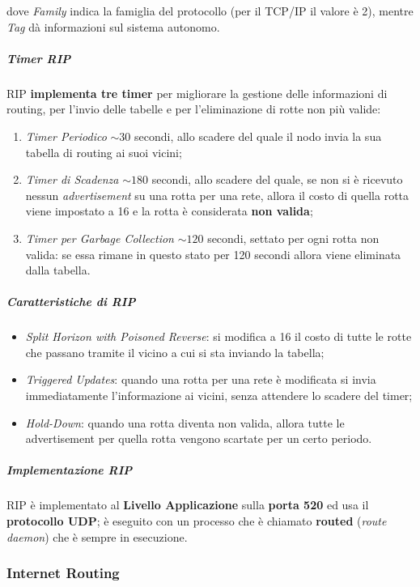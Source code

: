 \documentclass[a4paper]{article}
\begin{document}
					dove \emph{Family} indica la famiglia del protocollo (per il TCP/IP il valore è 2), mentre \emph{Tag} dà informazioni sul sistema autonomo.
					
				\subparagraph{Timer RIP}
					RIP \textbf{implementa tre timer} per migliorare la gestione delle informazioni di routing, per l'invio delle tabelle e per l'eliminazione di rotte non più valide:
					\begin{enumerate}
						\item \emph{Timer Periodico} $ \sim 30 $ secondi, allo scadere del quale il nodo invia la sua tabella di routing ai suoi vicini;
						\item \emph{Timer di Scadenza} $ \sim 180 $ secondi, allo scadere del quale, se non si è ricevuto nessun \emph{advertisement} su una rotta per una rete, allora il costo di quella rotta viene impostato a 16 e la rotta è considerata \textbf{non valida};
						\item \emph{Timer per Garbage Collection} $ \sim 120 $ secondi, settato per ogni rotta non valida: se essa rimane in questo stato per 120 secondi allora viene eliminata dalla tabella.
					\end{enumerate}
				
				\subparagraph{Caratteristiche di RIP}
					\begin{itemize}
						\item \emph{Split Horizon with Poisoned Reverse}: si modifica a 16 il costo di tutte le rotte che passano tramite il vicino a cui si sta inviando la tabella;
						\item \emph{Triggered Updates}: quando una rotta per una rete è modificata si invia immediatamente l'informazione ai vicini, senza attendere lo scadere del timer;
						\item \emph{Hold-Down}: quando una rotta diventa non valida, allora tutte le advertisement per quella rotta vengono scartate per un certo periodo.
					\end{itemize}
				
				\subparagraph{Implementazione RIP}
					RIP è implementato al \textbf{Livello Applicazione} sulla \textbf{porta 520} ed usa il \textbf{protocollo UDP}; è eseguito con un processo che è chiamato \textbf{routed} (\emph{route daemon}) che è sempre in esecuzione.
				
		
		\subsubsection{Internet Routing}
		
\end{document}
